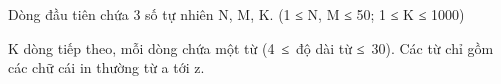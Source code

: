 Dòng đầu tiên chứa 3 số tự nhiên N, M, K. (1 ≤ N, M ≤ 50; 1 ≤ K ≤ 1000)

K dòng tiếp theo, mỗi dòng chứa một từ (4 ≤ độ dài từ ≤ 30). Các từ chỉ gồm các chữ cái in thường từ a tới z.